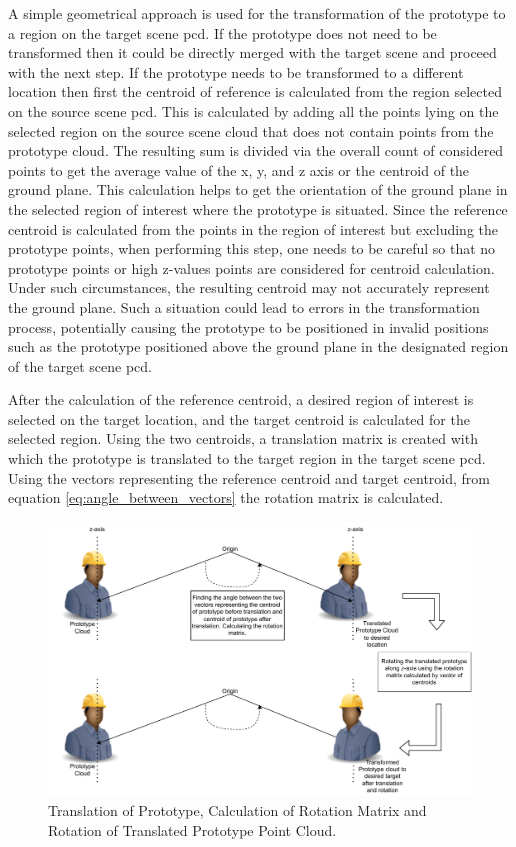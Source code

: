 A simple geometrical approach is used for the transformation of the prototype to a region on the target scene \acrshort{pcd}. If the prototype does not need to be transformed then it could be directly merged with the target scene and proceed with the next step. If the prototype needs to be transformed to a different location then first the centroid of reference is calculated from the region selected on the source scene \acrshort{pcd}. This is calculated by adding all the points lying on the selected region on the source scene cloud that does not contain points from the prototype cloud. The resulting sum is divided via the overall count of considered points to get the average value of the x, y, and z axis or the centroid of the ground plane. This calculation helps to get the orientation of the ground plane in the selected region of interest where the prototype is situated. Since the reference centroid is calculated from the points in the region of interest but excluding the prototype points, when performing this step, one needs to be careful so that no prototype points or high z-values points are considered for centroid calculation. Under such circumstances, the resulting centroid may not accurately represent the ground plane. Such a situation could lead to errors in the transformation process, potentially causing the prototype to be positioned in invalid positions such as the prototype positioned above the ground plane in the designated region of the target scene \acrshort{pcd}.

After the calculation of the reference centroid, a desired region of interest is selected on the target location, and the target centroid is calculated for the selected region. Using the two centroids, a translation matrix is created with which the prototype is translated to the target region in the target scene \acrshort{pcd}. Using the vectors representing the reference centroid and target centroid, from equation \ref{eq:angle_between_vectors} the rotation matrix is calculated.

\begin{figure}[htb]
    \centering
    \includegraphics[width=0.8\linewidth]{97_graphics/concepts/rotational_matrix_calculation.pdf}
    \caption{Translation of Prototype, Calculation of Rotation Matrix and Rotation of Translated Prototype Point Cloud.}
    \label{fig:rotation_matrix_calculation}
\end{figure}


